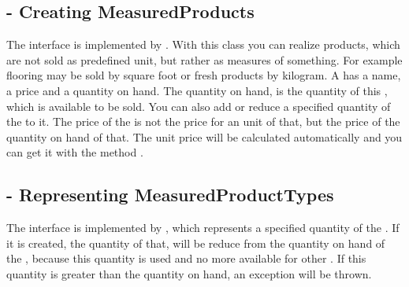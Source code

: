 \subsection{ - Creating MeasuredProducts}
The interface  is implemented by . With this class you can realize products, which are not sold as predefined unit, but rather 
as measures of something. For example flooring may be sold by square foot or fresh products by kilogram.
A  has a name, a price and a quantity on hand. The quantity on hand, is the quantity of this , which is available to 
be sold. You can also add or reduce a specified quantity of the  to it. 
The price of the  is not the price for an unit of that, but the price of the quantity on hand of that. The unit price will be calculated automatically 
and you can get it with the method .

\subsection{ - Representing MeasuredProductTypes}
The interface  is implemented by , which represents a specified quantity of the . If it is 
created, the quantity of that, will be reduce from the quantity on hand of the , because this quantity is used and no more available for other 
. If this quantity is greater than the quantity on hand, an exception will be thrown.
